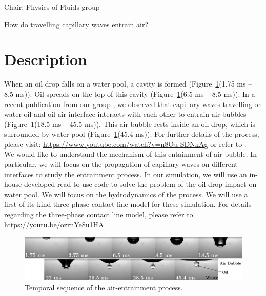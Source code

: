 \documentclass[a4paper,10pt]{article}
\begin{document}
\noindent Chair: Physics of Fluids group
\begin{center}
 \begin{LARGE}
  How do travelling capillary waves entrain air?
 \end{LARGE}
\end{center}
\section*{Description}
When an oil drop falls on a water pool, a cavity is formed (Figure~\ref{Figure::Typical}(1.75 ms -- 8.5 ms)). Oil spreads on the top of this cavity (Figure~\ref{Figure::Typical}(6.5 ms -- 8.5 ms)). In a recent publication from our group \citep{jain2019deep}, we observed that capillary waves travelling on water-oil and oil-air interface interacts with each-other to entrain air bubbles (Figure~\ref{Figure::Typical}(18.5 ms -- 45.5 ms)). This air bubble rests inside an oil drop, which is surrounded by water pool (Figure~\ref{Figure::Typical}(45.4 ms)). For further details of the process, please visit: \href{https://www.youtube.com/watch?v=n8Ou-SDNkAg}{https://www.youtube.com/watch?v=n8Ou-SDNkAg} or refer to \citet{jain2019deep}.\\
We would like to understand the mechanism of this entainment of air bubble. In particular, we will focus on the propagation of capillary waves on different interfaces to study the entrainment process. In our simulation, we will use an in-house developed read-to-use code to solve the problem of the oil drop impact on water pool. We will focus on the hydrodynamics of the process. We will use a first of its kind three-phase contact line model for these simulation. For details regarding the three-phase contact line model, please refer to \href{https://youtu.be/ozrnYe8u1HA}{https://youtu.be/ozrnYe8u1HA}.
\begin{figure}[H]
\begin{center}
\includegraphics[width=\textwidth]{drawing.pdf}
\caption{Temporal sequence of the air-entrainment process.}
\label{Figure::Typical}
\end{center}
\end{figure}
\end{document}
